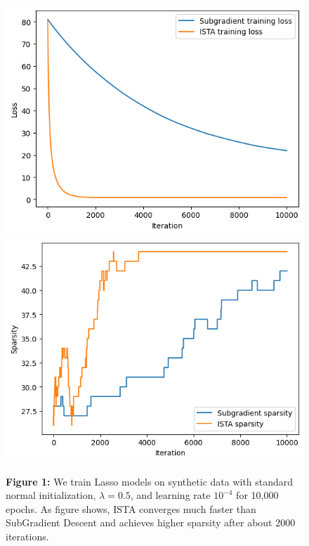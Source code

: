\documentclass[11pt]{article}
\begin{document}
\begin{figure}[H]
    \centering
    \begin{minipage}{0.25\textwidth}
        \includegraphics[width=\linewidth]{figures/fig1.png}
    \end{minipage}
    \begin{minipage}{0.25\textwidth}
        \includegraphics[width=\linewidth]{figures/fig2.png}
    \end{minipage}
    \hfill
    \begin{minipage}{0.4\textwidth}
        \small
        \textbf{Figure 1:} We train Lasso models  on synthetic data with standard normal initialization, \( \lambda = 0.5 \), and learning rate \( 10^{-4} \) for 10,000 epochs. As figure shows,
        ISTA converges much faster than SubGradient Descent and achieves higher sparsity after about 2000 iterations.
    \end{minipage}
\end{figure}
\end{document}
